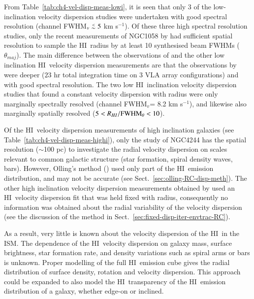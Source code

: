 \documentclass[traditabstract]{aa} %
\newcommand\lesim{\lower.5ex\hbox{$\; \buildrel < \over \sim \;$}}
\newcommand\HI{H{\small I}}
\newcommand\kms{km s$^{-1}$}
\begin{document}
From Table~\ref{tab:ch4-vel-disp-meas-lowi}, it is seen that only 3 of
the low-inclination velocity dispersion studies were undertaken with
good spectral resolution (channel FWHM$_v\lesim 5$ \kms). Of these
three high spectral resolution studies, only the recent measurements
of NGC1058 by \citet{pr2006} had sufficient spatial resolution to
sample the \HI\ radius by at least 10 synthesised beam FWHMs 
($\theta _{maj}$). The main
difference between the observations of \citet{pr2006} and the other
low inclination \HI\ velocity dispersion measurements are that the
observations by \citet{pr2006} were deeper ($23$ hr total integration
time on 3 VLA array configurations) and with good spectral resolution.
The two low \HI\ inclination velocity dispersion studies that found a
constant velocity dispersion with radius were only marginally
spectrally resolved (channel FWHM$_v$= 8.2 \kms), and likewise also
marginally spatially resolved ($5 < R_{HI}/{\rm FWHM}_{\theta} < 10$).

Of the \HI\ velocity dispersion measurements of high inclination galaxies
(see Table~\ref{tab:ch4-vel-disp-meas-highi}), only the study of
NGC4244 \citep{olling1996a} has the spatial resolution ($\sim$100 pc)
to investigate the radial velocity dispersion on scales relevant to
common galactic structure (star formation, spiral density waves, bars).
 However, Olling's method
(\citeyear{olling1996a}) used only part of the \HI\ emission
distribution, and may not be accurate (see
Sect.~\ref{sec:olling-RC-disp-meth}). The other high inclination
velocity dispersion measurements obtained by \citet{kvdkdb2004} used an
\HI\ velocity dispersion fit that was held fixed with radius, 
consequently no information was obtained about the radial variability 
of the velocity dispersion (see the discussion of the method in
Sect.~\ref{sec:fixed-disp-iter-envtrac-RC}).

As a result, very little is known about the velocity dispersion of the
\HI\ in the ISM. The dependence of the \HI\ velocity dispersion on
galaxy mass, surface brightness, star formation rate, and density
variations such as spiral arms or bars is unknown. Proper
modelling of the full \HI\ emission cube gives the radial distribution
of surface density, rotation and velocity dispersion. This approach
could be expanded to also model the \HI\ transparency of the \HI\
emission distribution of a galaxy, whether edge-on or inclined. 
\end{document}
